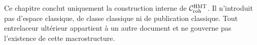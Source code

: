 \begin{warningbox}
Ce chapitre conclut uniquement la construction interne de
\(\mathcal C_{\rm coh}^{\rm HMT}\). Il n'introduit pas d'espace classique, de
classe classique ni de publication classique. Tout entrelaceur ultérieur
appartient à un autre document et ne gouverne pas l'existence de cette
macrostructure.
\end{warningbox}
\fi
